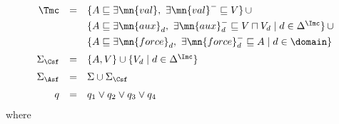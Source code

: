 \documentclass{lmcs}
\theoremstyle{definition}
\begin{document}
$$
\begin{array}{rcl}
  \Tmc &= &  \{  A \sqsubseteq \exists \mn{val}, \ \exists \mn{val}^- \sqsubseteq V \} \, \cup\\[1mm]
  && \{  A \sqsubseteq \exists \mn{aux}_d, \ \exists \mn{aux}_d^- \sqsubseteq V \sqcap V_d \mid  d \in \Delta^\Imc \} \, \cup \\[1mm]
  && \{ A \sqsubseteq \exists \mn{force}_d, \
  \exists \mn{force}^-_d  \sqsubseteq A\mid d\in\domain \} \\[2mm]
%     
  \Sigma_{\Csf} &=&
  \{ A,V \} \cup \{ V_d \mid d \in \Delta^\Imc \} \\[2mm]
  \Sigma_{\Asf} &=& \Sigma \cup \Sigma_\Csf \\[2mm]
  q &=& q_1\lor q_2\lor q_3 \lor q_{4}
\end{array}
$$
where %
%
\end{document}
